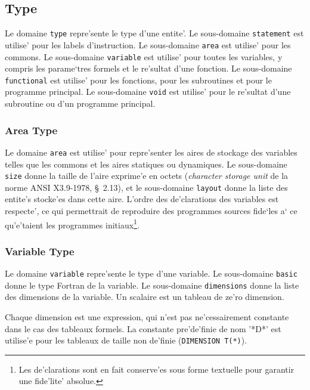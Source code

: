 \subsection{Type}
\label{subsection-type}

{
Le domaine \verb/type/ repre'sente le type d'une entite'.  Le
sous-domaine \verb/statement/ est utilise' pour les labels
d'instruction.  Le sous-domaine \verb/area/ est utilise' pour les
commons.  Le sous-domaine \verb/variable/ est utilise' pour toutes les
variables, y compris les parame`tres formels et le re'sultat d'une
fonction.  Le sous-domaine \verb/functional/ est utilise' pour les
fonctions, pour les subroutines et pour le programme principal.  Le
sous-domaine \verb/void/ est utilise' pour le re'sultat d'une subroutine
ou d'un programme principal.
}

\subsubsection{Area Type}
\label{subsubsection-area}

{ Le domaine {\tt area} est utilise' pour repre'senter les aires de
stockage des variables telles que les commons et les aires statiques ou
dynamiques. Le sous-domaine {\tt size} donne la taille de l'aire
exprime'e en octets ({\em character storage unit} de la norme ANSI
X3.9-1978, \S~2.13), et le sous-domaine {\tt layout} donne la liste des
entite's stocke'es dans cette aire. L'ordre des de'clarations des
variables est respecte', ce qui permettrait de reproduire des programmes
sources fide`les a` ce qu'e'taient les programmes initiaux\footnote{Les
de'clarations sont en fait conserve'es sous forme textuelle pour
garantir une fide'lite' absolue.}.}

\subsubsection{Variable Type}
\label{subsubsection-variable}

{
Le domaine \verb/variable/ repre'sente le type d'une variable.  Le
sous-domaine \verb/basic/ donne le type Fortran de la variable.  Le
sous-domaine \verb/dimensions/ donne la liste des dimensions de la variable.
Un scalaire est un tableau de ze'ro dimension.

Chaque dimension est une expression, qui n'est pas ne'cessairement
constante dans le cas des tableaux formels. La constante pre'de'finie de
nom '*D*' est utilise'e pour les tableaux de taille non de'finie
(\verb/DIMENSION T(*)/).
}

